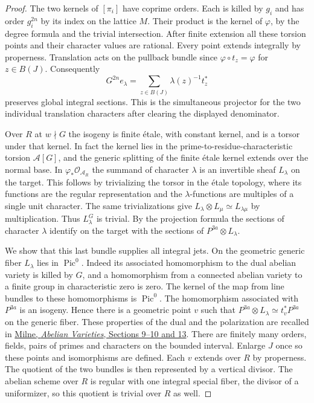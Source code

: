 \documentclass[a4paper,11pt]{article}
\theoremstyle{definition}
\theoremstyle{remark}
\numberwithin{equation}{section}
\begin{document}
\begin{proof}
The two kernels of \([\pi_i]\) have coprime orders. Each is killed
by \(g_i\) and has order \(g_i^{2n}\) by its index on the lattice
\(M\). Their product is the kernel of \(\varphi\), by the degree
formula and the trivial intersection. After finite extension all
these torsion points and their character values are rational.
Every point extends integrally by properness. Translation acts on
the pullback bundle since \(\varphi\circ t_z=\varphi\) for \(z\in B(J)\).
Consequently
\[
           G^{2n}e_\lambda=\sum_{z\in B(J)}\lambda(z)^{-1}t_z^*
\]
preserves global integral sections. This is the simultaneous
projector for the two individual translation characters after
clearing the displayed denominator.

Over \(R\) at \(w\nmid G\) the isogeny is finite \'etale, with
constant kernel, and is a torsor under that kernel. In fact the
kernel lies in the prime-to-residue-characteristic torsion \(\mathcal A[G]\),
and the generic splitting of
the finite \'etale kernel extends over the normal base.
In \(\varphi_*\mathcal O_{\mathcal A_R}\) the summand of character
\(\lambda\) is an invertible sheaf \(L_\lambda\) on the target.
This follows by trivializing the torsor in the \'etale topology,
where its functions are the regular representation and the
\(\lambda\)-functions are multiples of a single unit character.
The same trivializations give
\(L_\lambda\otimes L_\mu\simeq L_{\lambda\mu}\) by multiplication.
Thus \(L_\lambda^G\) is trivial. By the projection formula the
sections of character \(\lambda\) identify on the target with the
sections of \(P^{3a}\otimes L_\lambda\).

We show that this last bundle supplies all integral jets.
On the geometric generic fiber \(L_\lambda\) lies in
\(\operatorname{Pic}^0\). Indeed its associated homomorphism to
the dual abelian variety is killed by \(G\), and a homomorphism
from a connected abelian variety to a finite group in characteristic
zero is zero. The kernel of the map from line bundles to these
homomorphisms is \(\operatorname{Pic}^0\). The homomorphism
associated with \(P^{3a}\) is an isogeny. Hence there is a geometric
point \(v\) such that \(P^{3a}\otimes L_\lambda\simeq t_v^*P^{3a}\)
on the generic fiber. These properties of the dual and the
polarization are recalled in
\href{https://www.jmilne.org/math/xnotes/AVs.pdf}{Milne,
\emph{Abelian Varieties}, Sections 9--10 and 13}.
There are finitely many orders, fields, pairs of primes and characters
on the bounded interval. Enlarge \(J\) once so these points and
isomorphisms are defined. Each \(v\) extends over \(R\) by properness.
The quotient of the two bundles is then represented by a vertical
divisor. The abelian scheme over \(R\) is regular with one integral
special fiber, the divisor of a uniformizer, so this quotient is
trivial over \(R\) as well.


\end{proof}
\end{document}
